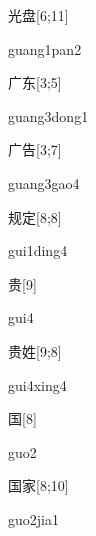 \begin{verbete}{光盘}[6;11]
\begin{pronuncia}{guang1pan2}
\end{pronuncia}
\end{verbete}

\begin{verbete}{广东}[3;5]
\begin{pronuncia}{guang3dong1}
\end{pronuncia}
\end{verbete}

\begin{verbete}{广告}[3;7]
\begin{pronuncia}{guang3gao4}
\end{pronuncia}
\end{verbete}

\begin{verbete}{规定}[8;8]
\begin{pronuncia}{gui1ding4}
\end{pronuncia}
\end{verbete}

\begin{verbete}[gui4]{贵}[9]
\begin{pronuncia}{gui4}
\end{pronuncia}
\end{verbete}

\begin{verbete}{贵姓}[9;8]
\begin{pronuncia}{gui4xing4}
\end{pronuncia}
\end{verbete}

\begin{verbete}[guo2]{国}[8]
\begin{pronuncia}{guo2}
\end{pronuncia}
\end{verbete}

\begin{verbete}{国家}[8;10]
\begin{pronuncia}{guo2jia1}
\end{pronuncia}
\end{verbete}

